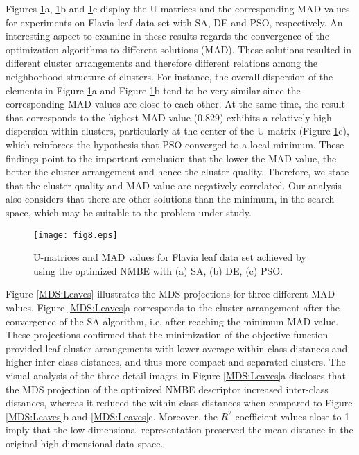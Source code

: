 Figures \ref{fig:MatrizU_leaves_II}a, \ref{fig:MatrizU_leaves_II}b and \ref{fig:MatrizU_leaves_II}c display the U-matrices and the corresponding MAD values for experiments on Flavia leaf data set with SA, DE and PSO, respectively. An interesting aspect to examine in these results regards the convergence of the optimization algorithms to different solutions (MAD). These solutions resulted in different cluster arrangements and therefore different relations among the neighborhood structure of clusters. For instance, the overall dispersion  of the elements in Figure \ref{fig:MatrizU_leaves_II}a and Figure \ref{fig:MatrizU_leaves_II}b tend to be very similar since  the corresponding MAD values are close to each other. At the same time, the result that corresponds to the highest MAD value ($0.829$) exhibits a relatively high dispersion within clusters, particularly at the center of the U-matrix (Figure \ref{fig:MatrizU_leaves_II}c), which reinforces the hypothesis that  PSO converged to a local minimum. These findings point to the important conclusion that the lower the MAD value, the better the cluster arrangement and hence the cluster quality. Therefore, we state that the cluster quality and MAD value are negatively correlated. Our analysis also considers that there are other solutions than the minimum, in the search space, which may be suitable to the problem under study. 

\begin{figure}[h!]
\centering
\texttt{[image: fig8.eps]}
 \caption{\label{fig:MatrizU_leaves_II}U-matrices and MAD values for Flavia leaf data set achieved by using  the optimized NMBE with (a) SA, (b) DE, (c) PSO.}
\end{figure}

Figure \ref{MDS:Leaves} illustrates the MDS projections for three different MAD values. Figure \ref{MDS:Leaves}a corresponds to the cluster arrangement after the convergence of the SA algorithm, i.e. after reaching the minimum MAD value. These projections confirmed that the minimization of the objective function provided leaf cluster arrangements with lower average within-class distances and higher inter-class distances, and thus  more compact and separated clusters. The visual analysis of the three detail images in Figure \ref{MDS:Leaves}a discloses that the MDS projection of the optimized NMBE descriptor increased inter-class distances, whereas it reduced the within-class distances when compared to Figure \ref{MDS:Leaves}b and \ref{MDS:Leaves}c. Moreover, the $R^2$ coefficient values close to 1 imply that the low-dimensional representation preserved the mean distance in the original high-dimensional data space.

